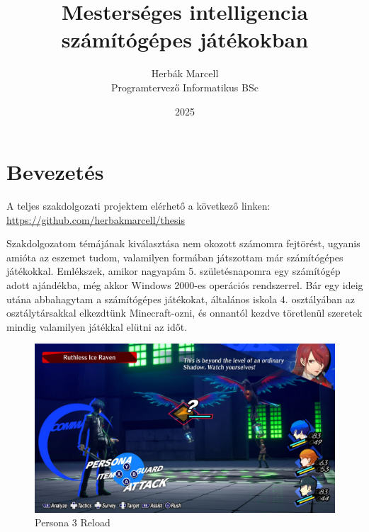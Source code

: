 \documentclass[
]{thesis-ekf}
\theoremstyle{definition}
\theoremstyle{remark}
\begin{document}
\title{Mesterséges intelligencia számítógépes játékokban}
\author{Herbák Marcell\\Programtervező Informatikus BSc}
\date{2025}
\maketitle

\tableofcontents

\chapter{Bevezetés}

A teljes szakdolgozati projektem elérhető a következő linken: \url{https://github.com/herbakmarcell/thesis}

Szakdolgozatom témájának kiválasztása nem okozott számomra fejtörést, ugyanis amióta az eszemet tudom, valamilyen formában játszottam már számítógépes játékokkal. Emlékszek, amikor nagyapám 5. születésnapomra egy számítógép adott ajándékba, még akkor Windows 2000-es operációs rendszerrel. Bár egy ideig utána abbahagytam a számítógépes játékokat, általános iskola 4. osztályában az osztálytársakkal elkezdtünk Minecraft-ozni, és onnantól kezdve töretlenül szeretek mindig valamilyen játékkal elütni az időt. 

\begin{figure}[h!]
	\centering
	\includegraphics[width=14cm]{./pictures/persona3_xbox.png}
	\caption{Persona 3 Reload}
	\label{persona3}
\end{figure}
\end{document}
